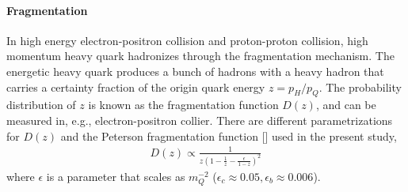 \paragraph{Fragmentation} 
In high energy electron-positron collision and proton-proton collision, high momentum heavy quark hadronizes through the fragmentation mechanism.
The energetic heavy quark produces a bunch of hadrons with a heavy hadron that carries a certainty fraction of the origin quark energy $z = p_H/p_Q$.
The probability distribution of $z$ is known as the fragmentation function $D(z)$, and can be measured in, e.g., electron-positron collier.
There are different parametrizations for $D(z)$ and the Peterson fragmentation function [] used in the present study,
\begin{eqnarray}
D(z) \propto \frac{1}{z(1-\frac{1}{z} - \frac{\epsilon}{1-z})^2}
\end{eqnarray}
where $\epsilon$ is a parameter that scales as $m_Q^{-2}$ ($\epsilon_c \approx 0.05, \epsilon_b \approx 0.006$).

